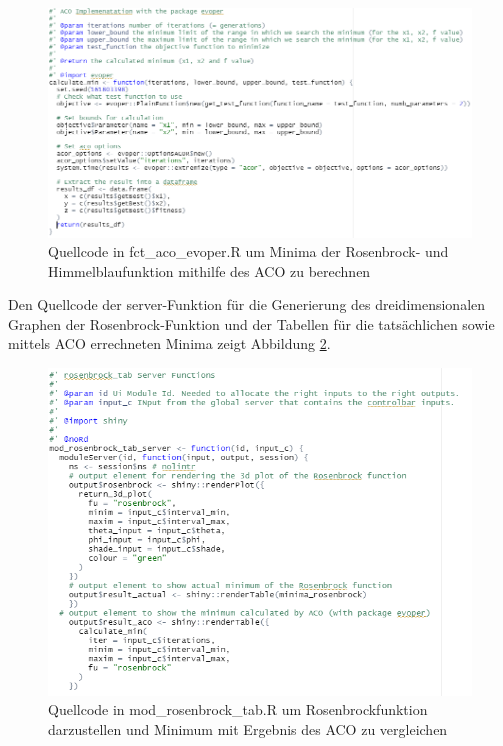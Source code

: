 \begin{figure}[H]
 \centering
 \includegraphics[scale=0.7]{"images/04_Visualisierung_des_Algorithmus/evoper_calculate_Minimum_HimRose"}
 \caption{Quellcode in fct\_aco\_evoper.R um Minima der Rosenbrock- und Himmelblaufunktion mithilfe des ACO zu berechnen}
 \label{fig:evoper_Minima_RoseHim_ACO}
\end{figure}

 Den Quellcode der server-Funktion für die Generierung des dreidimensionalen Graphen der Rosenbrock-Funktion und der Tabellen für die tatsächlichen sowie mittels ACO errechneten Minima zeigt Abbildung \ref{fig:server_Minima_Rose_ACO}.

\begin{figure}[H]
 \centering
 \includegraphics[scale=.7]{"images/04_Visualisierung_des_Algorithmus/server_minima_rosenbrock"}
 \caption{Quellcode in mod\_rosenbrock\_tab.R um Rosenbrockfunktion darzustellen und Minimum mit Ergebnis des ACO zu vergleichen}
 \label{fig:server_Minima_Rose_ACO}
\end{figure}

